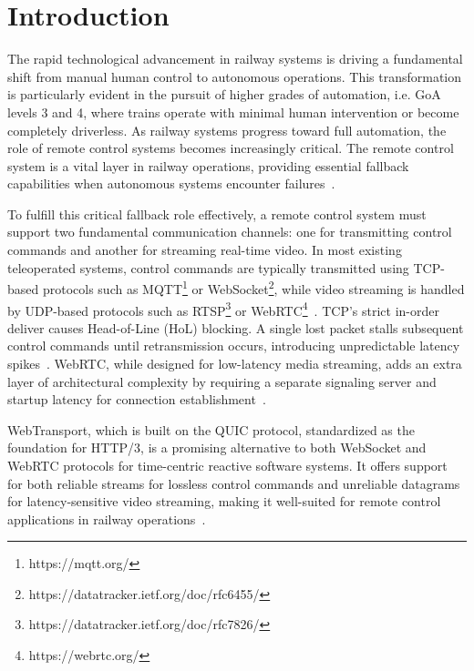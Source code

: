 \section{Introduction}
\label{sec:intro}
    The rapid technological advancement in railway systems is driving a fundamental shift from manual human control to autonomous operations. This transformation is particularly evident in the pursuit of higher grades of automation, i.e. GoA levels 3 and 4, where trains operate with minimal human intervention or become completely driverless. As railway systems progress toward full automation, the role of remote control systems becomes increasingly critical. The remote control system is a vital layer in railway operations, providing essential fallback capabilities when autonomous systems encounter failures~\cite{CoganMilius23}.

    To fulfill this critical fallback role effectively, a remote control system must support two fundamental communication channels: one for transmitting control commands and another for streaming real-time video. In most existing teleoperated systems, control commands are typically transmitted using TCP-based protocols such as MQTT\footnote{https://mqtt.org/} or WebSocket\footnote{https://datatracker.ietf.org/doc/rfc6455/}, while video streaming is handled by UDP-based protocols such as RTSP\footnote{https://datatracker.ietf.org/doc/rfc7826/} or WebRTC\footnote{https://webrtc.org/}~\cite{SunTsai25, FezeuCZDVBS+26}. TCP's strict in-order deliver causes Head-of-Line (HoL) blocking. A single lost packet stalls subsequent control commands until retransmission occurs, introducing unpredictable latency spikes~\cite{LangleyRWVKZ+17}. WebRTC, while designed for low-latency media streaming, adds an extra layer of architectural complexity by requiring a separate signaling server and startup latency for connection establishment~\cite{MejiasYMVA+25}.

    WebTransport, which is built on the QUIC protocol, standardized as the foundation for HTTP/3, is a promising alternative to both WebSocket and WebRTC protocols for time-centric reactive software systems. It offers support for both reliable streams for lossless control commands and unreliable datagrams for latency-sensitive video streaming, making it well-suited for remote control applications in railway operations~\cite{w3c_webtransport,AmetTS25}.

